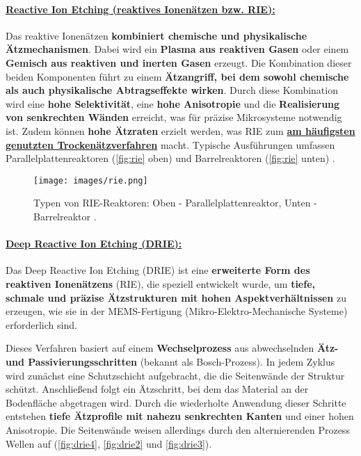 \documentclass{article} %
\begin{document}
\paragraph{\uline{Reactive Ion Etching (reaktives Ionenätzen bzw. RIE):}} Das reaktive Ionenätzen \textbf{kombiniert chemische und physikalische Ätzmechanismen}. Dabei wird ein \textbf{Plasma aus reaktiven Gasen} oder einem \textbf{Gemisch aus reaktiven und inerten Gasen} erzeugt. Die Kombination dieser beiden Komponenten führt zu einem \textbf{Ätzangriff, bei dem sowohl chemische als auch physikalische Abtragseffekte wirken}. Durch diese Kombination wird eine \textbf{hohe Selektivität}, eine \textbf{hohe Anisotropie} und die \textbf{Realisierung von senkrechten Wänden} erreicht, was für präzise Mikrosysteme notwendig ist. Zudem können \textbf{hohe Ätzraten} erzielt werden, was RIE zum \textbf{\uline{am häufigsten genutzten Trockenätzverfahren}} macht. Typische Ausführungen umfassen Parallelplattenreaktoren (\autoref{fig:rie} oben) und Barrelreaktoren (\autoref{fig:rie} unten) \cite{madou2002}.

\begin{figure}[htb!]
    \centering
    \texttt{[image: images/rie.png]} %
    \captionsetup{labelfont=bf, width=\textwidth} %
    \caption{Typen von RIE-Reaktoren: Oben - Parallelplattenreaktor, Unten - Barrelreaktor \cite{schmid2024Aetzen}.}
    \label{fig:rie}
\end{figure}

\paragraph{\uline{Deep Reactive Ion Etching (DRIE):}} 
Das Deep Reactive Ion Etching (DRIE) ist eine \textbf{erweiterte Form des reaktiven Ionenätzens} (RIE), die speziell entwickelt wurde, um \textbf{tiefe, schmale und präzise Ätzstrukturen mit hohen Aspektverhältnissen} zu erzeugen, wie sie in der MEMS-Fertigung (Mikro-Elektro-Mechanische Systeme) erforderlich sind.

\vspace{1em}

Dieses Verfahren basiert auf einem \textbf{Wechselprozess} aus abwechselnden \textbf{Ätz- und Passivierungsschritten} (bekannt als Bosch-Prozess). In jedem Zyklus wird zunächst eine Schutzschicht aufgebracht, die die Seitenwände der Struktur schützt. Anschließend folgt ein Ätzschritt, bei dem das Material an der Bodenfläche abgetragen wird. Durch die wiederholte Anwendung dieser Schritte entstehen \textbf{tiefe Ätzprofile mit nahezu senkrechten Kanten} und einer hohen Anisotropie. Die Seitenwände weisen allerdings durch den alternierenden Prozess Wellen auf (\autoref{fig:drie4}, \autoref{fig:drie2} und \autoref{fig:drie3}).
\end{document}

